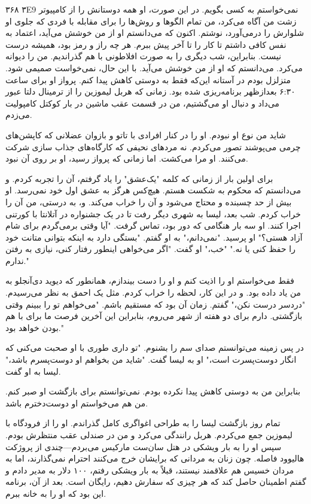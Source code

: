 ۳۶۸  
۳E9  
نمی‌خواستم به کسی بگویم. در این صورت، او همه دوستانش را از کامپیوتر زشت من آگاه می‌کرد، من تمام الگوها و روش‌ها را برای مقابله با فردی که جلوی او شلوارش را درمی‌آورد، نوشتم. اکنون که می‌دانستم او از من خوشش می‌آید، اعتماد به نفس کافی داشتم تا کار را تا آخر پیش ببرم.  
هر چه راز و رمز بود، همیشه درست نیست.  
بنابراین، شب دیگری را به صورت افلاطونی با هم گذراندیم. من را دیوانه می‌کرد. می‌دانستم که او از من خوشش می‌آید. با این حال، نمی‌خواست صمیمی شود. متزلزل بودم در آستانه این‌که فقط به دوستی کاهش پیدا کنم. پرواز او برای ساعت ۶:۳۰ بعدازظهر برنامه‌ریزی شده بود. زمانی که هربل لیموزین را از ترمینال دلتا عبور می‌داد و دنبال او می‌گشتیم، من در قسمت عقب ماشین در بار کوکتل کامپولیت می‌زدم.  

شاید من نوع او نبودم. او را در کنار افرادی با تاتو و بازوان عضلانی که کاپشن‌های چرمی می‌پوشند تصور می‌کردم. نه مردهای نحیفی که کارگاه‌های جذاب سازی شرکت می‌کنند. او مرا می‌کشت. اما زمانی که پرواز رسید، او بر روی آن نبود.  

برای اولین بار از زمانی که کلمه "یک‌عشق" را یاد گرفتم، آن را تجربه کردم. و می‌دانستم که محکوم به شکست هستم. هیچ‌کس هرگز به عشق اول خود نمی‌رسد. او بیش از حد چسبنده و محتاج می‌شود و آن را خراب می‌کند. و، به درستی، من آن را خراب کردم. شب بعد، لیسا به شهری دیگر رفت تا در یک جشنواره در آتلانتا با کورتنی اجرا کنند. او سه بار هنگامی که دور بود، تماس گرفت.  
"آیا وقتی برمی‌گردم برای شام آزاد هستی؟" او پرسید.  
"نمی‌دانم،" به او گفتم. "بستگی دارد به اینکه بتوانی متانت خود را حفظ کنی یا نه."  
"خب،" او گفت. "اگر می‌خواهی اینطور رفتار کنی، نیازی به رفتن ندارم."  

فقط می‌خواستم او را اذیت کنم و او را دست بیندازم، همانطور که دیوید دی‌آنجلو به من یاد داده بود. و در این کار، لحظه را خراب کردم. مثل یک احمق به نظر می‌رسیدم.  
"دردسر درست نکن،" گفتم. زمان آن بود که مستقیم باشم. "می‌خواهم تو را ببینم وقتی بازگشتی. دارم برای دو هفته از شهر می‌روم، بنابراین این آخرین فرصت ما برای با هم بودن خواهد بود."  

در پس زمینه می‌توانستم صدای سم را بشنوم. "تو داری طوری با او صحبت می‌کنی که انگار دوست‌پسرت است،" او به لیسا گفت.  
"شاید من بخواهم او دوست‌پسرم باشد،" لیسا به او گفت.  

بنابراین من به دوستی کاهش پیدا نکرده بودم. نمی‌توانستم برای بازگشت او صبر کنم. من هم می‌خواستم او دوست‌دخترم باشد.  

تمام روز بازگشت لیسا را به طراحی اغواگری کامل گذراندم. او را از فرودگاه با لیموزین جمع می‌کردم. هربل رانندگی می‌کرد و من در صندلی عقب منتظرش بودم. سپس او را به بار ویشکی در هتل سان‌ست مارکیس می‌بردم—چندی از پروژکت هالیوود فاصله. چون زنان به مردانی که برایشان خرج می‌کنند احترام نمی‌گذارند، اما به مردان خسیس هم علاقمند نیستند، قبلاً به بار ویشکی رفتم، ۱۰۰ دلار به مدیر دادم و گفتم اطمینان حاصل کند که هر چیزی که سفارش دهیم، رایگان است. بعد از آن، برنامه این بود که او را به خانه ببرم.
